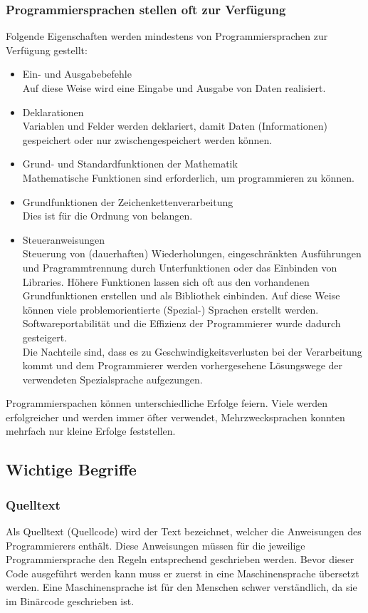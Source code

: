 \documentclass[12pt,a4paper]{report}
\begin{document}
\begin{onehalfspace}
\subsubsection{Programmiersprachen stellen oft zur Verfügung}
Folgende Eigenschaften werden mindestens von Programmiersprachen zur Verfügung gestellt:
\begin{itemize}
\item Ein- und Ausgabebefehle\\
Auf diese Weise wird eine Eingabe und Ausgabe von Daten realisiert.
\item Deklarationen\\
Variablen und Felder werden deklariert, damit Daten (Informationen) gespeichert oder nur zwischengespeichert werden können.
\item Grund- und Standardfunktionen der Mathematik\\
Mathematische Funktionen sind erforderlich, um programmieren zu können.
\item Grundfunktionen der Zeichenkettenverarbeitung\\
Dies ist für die Ordnung von belangen.
\item Steueranweisungen\\
Steuerung von (dauerhaften) Wiederholungen, eingeschränkten Ausführungen und Pragrammtrennung durch Unterfunktionen oder das Einbinden von Libraries. Höhere Funktionen lassen sich oft aus den vorhandenen Grundfunktionen erstellen und als Bibliothek einbinden. Auf diese Weise können viele problemorientierte (Spezial-) Sprachen erstellt werden. Softwareportabilität und die Effizienz der Programmierer wurde dadurch gesteigert.\\
Die Nachteile sind, dass es zu Geschwindigkeitsverlusten bei der Verarbeitung kommt und dem Programmierer werden vorhergesehene Lösungswege der verwendeten Spezialsprache aufgezungen.
\end{itemize}
Programmierspachen können unterschiedliche Erfolge feiern. Viele werden erfolgreicher und werden immer öfter verwendet,  Mehrzwecksprachen konnten mehrfach nur kleine Erfolge feststellen.

\subsection{Wichtige Begriffe}
\subsubsection{Quelltext}
Als Quelltext (Quellcode) wird der Text bezeichnet, welcher die Anweisungen des Programmierers enthält. Diese Anweisungen müssen für die jeweilige Programmiersprache den Regeln entsprechend geschrieben werden. Bevor dieser Code ausgeführt werden kann muss er zuerst in eine Maschinensprache übersetzt werden. Eine Maschinensprache ist für den Menschen schwer verständlich, da sie im Binärcode geschrieben ist.


\end{onehalfspace}
\end{document}
